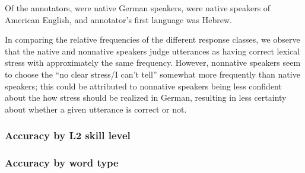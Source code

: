 		Of the \TODO annotators, \TODO were native German speakers,  were native speakers of American English, and  annotator's first language was Hebrew. 

		In comparing the relative frequencies of the different response classes, we observe that the native and nonnative speakers judge utterances as having correct lexical stress with approximately the same frequency. However, nonnative speakers seem to choose the ``no clear stress/I can't tell'' somewhat more frequently than native speakers; this could be attributed to nonnative speakers being less confident about the how stress should be realized in German, resulting in less certainty about whether a given utterance is correct or not. 
		
		\subsubsection{Accuracy by L2 skill level}
		
		
		
		\subsubsection{Accuracy by word type}

